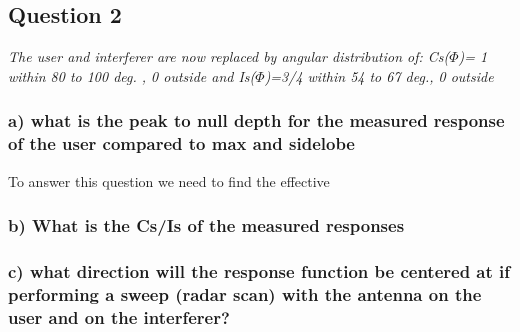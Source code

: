 \subsection{Question 2}
\textit{The user and interferer are now replaced by angular distribution of: Cs($\Phi$)= 1 within 80 to 100 deg. , 0 outside and Is($\Phi$)=3/4 within 54 to 67 deg., 0 outside}

\subsubsection{a) what is the peak to null depth for the measured response of the user compared to max and sidelobe}

To answer this question we need to find the effective 

\subsubsection{b) What is the Cs/Is of the measured responses}

\subsubsection{c) what direction will the response function be centered at if performing a sweep (radar scan) with the antenna on the user and on the interferer?}